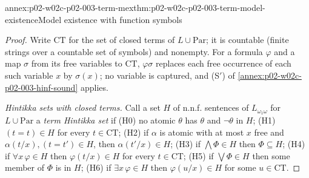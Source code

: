 \begin{annexitem}{annex:p02-w02c-p02-003-term-mex}{thm:p02-w02c-p02-003-term-model-existence}{Model existence with function symbols}
\begin{proof}
Write \(\mathrm{CT}\) for the set of closed terms of \(L\cup\mathrm{Par}\);
it is countable (finite strings over a countable set of symbols) and
nonempty.  For a formula \(\varphi\) and a map \(\sigma\) from its free
variables to \(\mathrm{CT}\), \(\varphi\sigma\) replaces each free
occurrence of each such variable \(x\) by \(\sigma(x)\); no variable is
captured, and (S\('\)) of \cref{annex:p02-w02c-p02-003-hinf-sound}
applies.

\emph{Hintikka sets with closed terms.}  Call a set \(H\) of n.n.f.
sentences of \(L_{\omega_1\omega}\) for \(L\cup\mathrm{Par}\) a
\emph{term Hintikka set} if (H0) no atomic \(\theta\) has \(\theta\) and
\(\neg\theta\) in \(H\); (H1) \((t=t)\in H\) for every \(t\in\mathrm{CT}\);
(H2) if \(\alpha\) is atomic with at most \(x\) free and
\(\alpha(t/x),(t=t')\in H\), then \(\alpha(t'/x)\in H\); (H3) if
\(\bigwedge\Phi\in H\) then \(\Phi\subseteq H\); (H4) if
\(\forall x\,\varphi\in H\) then \(\varphi(t/x)\in H\) for every
\(t\in\mathrm{CT}\); (H5) if \(\bigvee\Phi\in H\) then some member of
\(\Phi\) is in \(H\); (H6) if \(\exists x\,\varphi\in H\) then
\(\varphi(u/x)\in H\) for some \(u\in\mathrm{CT}\).


\end{proof}
\end{annexitem}
